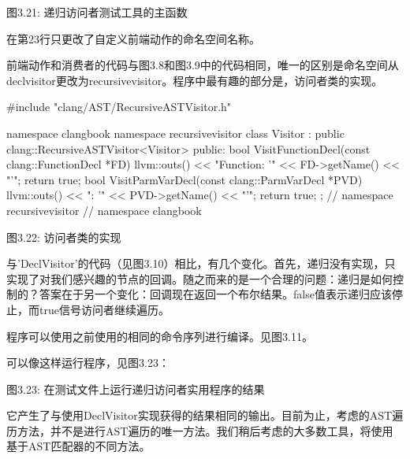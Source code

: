 \begin{center}
图3.21: 递归访问者测试工具的主函数
\end{center}

在第23行只更改了自定义前端动作的命名空间名称。

前端动作和消费者的代码与图3.8和图3.9中的代码相同，唯一的区别是命名空间从declvisitor更改为recursivevisitor。程序中最有趣的部分是，访问者类的实现。

\begin{cpp}
#include "clang/AST/RecursiveASTVisitor.h"

namespace clangbook {
namespace recursivevisitor {
class Visitor : public clang::RecursiveASTVisitor<Visitor> {
public:
  bool VisitFunctionDecl(const clang::FunctionDecl *FD) {
    llvm::outs() << "Function: '" << FD->getName() << "'\n";
    return true;
  }
  bool VisitParmVarDecl(const clang::ParmVarDecl *PVD) {
    llvm::outs() << "\tParameter: '" << PVD->getName() << "'\n";
    return true;
  }
};
} // namespace recursivevisitor
} // namespace clangbook
\end{cpp}

\begin{center}
图3.22: 访问者类的实现
\end{center}

与'DeclVisitor'的代码（见图3.10）相比，有几个变化。首先，递归没有实现，只实现了对我们感兴趣的节点的回调。随之而来的是一个合理的问题：递归是如何控制的？答案在于另一个变化：回调现在返回一个布尔结果。false值表示递归应该停止，而true信号访问者继续遍历。

程序可以使用之前使用的相同的命令序列进行编译。见图3.11。

可以像这样运行程序，见图3.23：


\begin{center}
图3.23: 在测试文件上运行递归访问者实用程序的结果
\end{center}

它产生了与使用DeclVisitor实现获得的结果相同的输出。目前为止，考虑的AST遍历方法，并不是进行AST遍历的唯一方法。我们稍后考虑的大多数工具，将使用基于AST匹配器的不同方法。




































